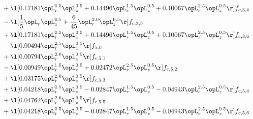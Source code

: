 \begin{alignat}{2}
& + \l[  0.17181 \opL_r^{0.5} \opL_z^{0.5} +  0.14496 \opL_r^{1.5} \opL_z^{0.5} +  0.10067 \opL_r^{2.5} \opL_z^{0.5}  \r] f_{c,3,4} \nonumber \\ 
& - \l[ \frac{1}{5} \opL_r \opL_z^{0.5} + \frac{6}{45} \opL_r^{2.0} \opL_z^{0.5}  \r] f_{c,3,5} \nonumber \\ 
& + \l[  0.17181 \opL_r^{0.5} \opL_z^{0.5} +  0.14496 \opL_r^{1.5} \opL_z^{0.5} +  0.10067 \opL_r^{2.5} \opL_z^{0.5}  \r] f_{c,3,6} \nonumber \\ 
& - \l[  0.00494 \opL_r^{2.5} \opL_z^{0.5}  \r] f_{5,0} \nonumber \\ 
& + \l[  0.00794 \opL_r^{2.0} \opL_z^{0.5}  \r] f_{c,5,1} \nonumber \\ 
& - \l[  0.00949 \opL_r^{1.5} \opL_z^{0.5} +  0.02472 \opL_r^{2.5} \opL_z^{0.5}  \r] f_{c,5,2} \nonumber \\ 
& + \l[  0.03175 \opL_r^{2.0} \opL_z^{0.5}  \r] f_{c,5,3} \nonumber \\ 
& + \l[  0.04218 \opL_r^{0.5} \opL_z^{0.5}   -0.02847 \opL_r^{1.5} \opL_z^{0.5}   -0.04943 \opL_r^{2.5} \opL_z^{0.5}  \r] f_{c,5,4} \nonumber \\ 
& + \l[  0.04762 \opL_r^{2.0} \opL_z^{0.5}  \r] f_{c,5,5} \nonumber \\ 
& + \l[  0.04218 \opL_r^{0.5} \opL_z^{0.5}   -0.02847 \opL_r^{1.5} \opL_z^{0.5}   -0.04943 \opL_r^{2.5} \opL_z^{0.5}  \r] f_{c,5,6} \nonumber \\ 
\end{alignat} 


